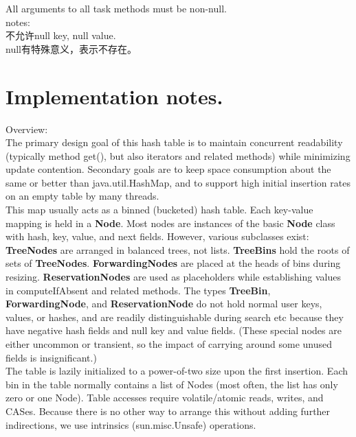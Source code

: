 \documentclass[UTF8,11pt]{ctexbook}
\newcommand{\bold}[1]{\textbf{#1}}
\begin{document}
	All arguments to all task methods must be non-null.\\
	
	notes:\\
	不允许null key, null value.\\
	null有特殊意义，表示不存在。
	 
	

	\section{Implementation notes.} 
	Overview:\\
	
	The primary design goal of this hash table is to maintain
	concurrent readability (typically method get(), but also
	iterators and related methods) while minimizing update
	contention. Secondary goals are to keep space consumption about
	the same or better than java.util.HashMap, and to support high
	initial insertion rates on an empty table by many threads.\\
	
	This map usually acts as a binned (bucketed) hash table.  Each
	key-value mapping is held in a \bold{Node}.  Most nodes are instances
	of the basic \bold{Node} class with hash, key, value, and next
	fields. However, various subclasses exist: \bold{TreeNodes} are
	arranged in balanced trees, not lists.  \bold{TreeBins} hold the roots
	of sets of \bold{TreeNodes}. \bold{ForwardingNodes} are placed at the heads
	of bins during resizing. \bold{ReservationNodes} are used as
	placeholders while establishing values in computeIfAbsent and
	related methods.  The types \bold{TreeBin}, \bold{ForwardingNode}, and
	\bold{ReservationNode} do not hold normal user keys, values, or
	hashes, and are readily distinguishable during search etc
	because they have negative hash fields and null key and value
	fields. (These special nodes are either uncommon or transient,
	so the impact of carrying around some unused fields is
	insignificant.)\\
	
	The table is lazily initialized to a power-of-two size upon the
	first insertion.  Each bin in the table normally contains a
	list of Nodes (most often, the list has only zero or one Node).
	Table accesses require volatile/atomic reads, writes, and
	CASes.  Because there is no other way to arrange this without
	adding further indirections, we use intrinsics
	(sun.misc.Unsafe) operations.\\
	
\end{document}
